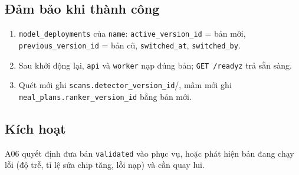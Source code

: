 \subsection{Đảm bảo khi thành công}
\begin{enumerate}
\item {\small\texttt{model\_\allowbreak{}\allowbreak{}deployments}} của {\small\texttt{name}}: {\small\texttt{active\_\allowbreak{}\allowbreak{}version\_\allowbreak{}\allowbreak{}id}} = bản mới, {\small\texttt{previous\_\allowbreak{}\allowbreak{}version\_\allowbreak{}\allowbreak{}id}} = bản cũ, {\small\texttt{switched\_\allowbreak{}\allowbreak{}at}}, {\small\texttt{switched\_\allowbreak{}\allowbreak{}by}}.
\item Sau khởi động lại, {\small\texttt{api}} và {\small\texttt{worker}} nạp đúng bản; {\small\texttt{GET /\allowbreak{}\allowbreak{}readyz}} trả sẵn sàng.
\item Quét mới ghi {\small\texttt{scans.\allowbreak{}detector\_\allowbreak{}\allowbreak{}version\_\allowbreak{}\allowbreak{}id}}/, mâm mới ghi {\small\texttt{meal\_\allowbreak{}\allowbreak{}plans.\allowbreak{}ranker\_\allowbreak{}\allowbreak{}version\_\allowbreak{}\allowbreak{}id}} bằng bản mới.
\end{enumerate}
\subsection{Kích hoạt}
A06 quyết định đưa bản {\small\texttt{validated}} vào phục vụ, hoặc phát hiện bản đang chạy lỗi (độ trễ, tỉ lệ sửa chip tăng, lỗi nạp) và cần quay lui.

